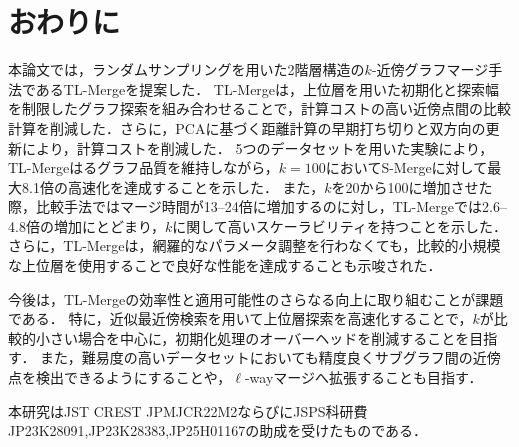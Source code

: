 \documentclass[submit,techrep,noauthor]{ipsj}
\begin{document}
\section{おわりに}
\label{sec:conc}
本論文では，ランダムサンプリングを用いた2階層構造の$k$-近傍グラフマージ手法であるTL-Mergeを提案した．
TL-Mergeは，上位層を用いた初期化と探索幅を制限したグラフ探索を組み合わせることで，計算コストの高い近傍点間の比較計算を削減した．さらに，PCAに基づく距離計算の早期打ち切りと双方向の更新により，計算コストを削減した．
5つのデータセットを用いた実験により，TL-Mergeはるグラフ品質を維持しながら，$k=100$においてS-Mergeに対して最大8.1倍の高速化を達成することを示した．
また，$k$を20から100に増加させた際，比較手法ではマージ時間が13--24倍に増加するのに対し，TL-Mergeでは2.6--4.8倍の増加にとどまり，$k$に関して高いスケーラビリティを持つことを示した．
さらに，TL-Mergeは，網羅的なパラメータ調整を行わなくても，比較的小規模な上位層を使用することで良好な性能を達成することも示唆された．

今後は，TL-Mergeの効率性と適用可能性のさらなる向上に取り組むことが課題である．
特に，近似最近傍検索を用いて上位層探索を高速化することで，$k$が比較的小さい場合を中心に，初期化処理のオーバーヘッドを削減することを目指す．
また，難易度の高いデータセットにおいても精度良くサブグラフ間の近傍点を検出できるようにすることや，$\ell$-wayマージへ拡張することも目指す．


\begin{acknowledgment}
本研究はJST CREST JPMJCR22M2ならびにJSPS科研費JP23K28091,JP23K28383,JP25H01167の助成を受けたものである．
\end{acknowledgment}




\end{document}
